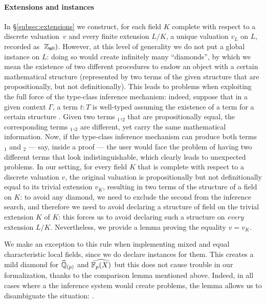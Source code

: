 \documentclass[sigplan,10pt, nonacm, review]{acmart}
\begin{document}
\paragraph{Extensions and  instances}
In \S\ref{subsec:extensions} we construct, for each field $K$ complete with respect to a discrete valuation~$v$ and every finite extension $L/K$, a unique valuation $v_L$ on $L$, recorded as $\;\mathbb{Z}_{\mathtt{m}0})$. However, at this level of generality we do not put a global  instance on $L$: doing so would create infinitely many ``diamonds'', by which we mean the existence of two different procedures to endow an object with a certain mathematical structure (represented by two terms of the given structure that are propositionally, but not definitionally). This leads to problems when exploiting the full force of the type-class inference mechanism: indeed, suppose that in a given context $\Gamma$, a term $t:T$ is well-typed assuming the existence of a term  for a certain structure . Given two terms $_1$,$_2$ that are propositionally equal, the corresponding terms $_1$,$_2$ are different, yet carry the same mathematical information. Now, if the type-class inference mechanism can produce both terms $_1$ and $_2$ --- say, inside a proof --- the user would face the problem of having two different terms that look indistinguishable, which clearly leads to unexpected problems. In our setting, for every field $K$ that is complete with respect to a discrete valuation $v$, the original valuation is propositionally but not definitionally equal to its trivial extension $v_K$, resulting in two terms of the structure of a  field on $K$: to avoid any diamond, we need to exclude the second from the inference search, and therefore we need to avoid declaring a structure of  field on the trivial extension $K$ of $K$: this forces us to avoid declaring such a structure on \emph{every} extension $L/K$. Nevertheless, we provide a lemma \href{https://github.com/LCFT-Lean/local_fields/blob/76ad487d09babdb0018f394a5634526637ee014a/src/discrete_valuation_ring/trivial_extension.lean#L58}{\extlink} proving the equality $v=v_K$.

We make an exception to this rule when implementing mixed and equal characteristic local fields, since we do declare  instances for them. This creates a mild diamond for $\widehat{\mathbb{Q}}_{(p)}$ and $\FpXCompl$ but this does not cause trouble in our formalization, thanks to the comparison lemma \href{https://github.com/LCFT-Lean/local_fields/blob/76ad487d09babdb0018f394a5634526637ee014a/src/discrete_valuation_ring/trivial_extension.lean#L58}{\extlink} mentioned above. Indeed, in all cases where a the inference system would create problems, the lemma allows us to disambiguate the situation: .
\end{document}
